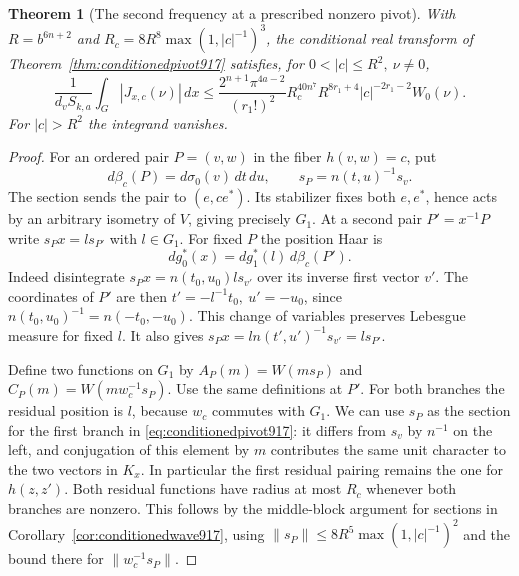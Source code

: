 \documentclass[a4paper,11pt]{article}
\newtheorem{theorem}[proposition]{Theorem}
\theoremstyle{definition}
\theoremstyle{remark}
\numberwithin{equation}{section}
\begin{document}
\begin{theorem}[The second frequency at a prescribed nonzero pivot]
\leavevmode\label{thm:secondallpositions918}
With \(R=b^{6n+2}\) and \(R_c=8R^8\max(1,|c|^{-1})^3\), the
conditional real transform of Theorem~\ref{thm:conditionedpivot917}
satisfies, for \(0<|c|\le R^2,\ \nu\ne0\),
\begin{equation}
 \frac{1}{d_vS_{k,a}}\int_G |J_{x,c}(\nu)|\,dx
 \le
 \frac{2^{n+1}\pi^{4a-2}}{(r_1!)^2}
    R_c^{40n^7} R^{8r_1+4}|c|^{-2r_1-2} W_0(\nu).
 \label{eq:secondallpositions918}
\end{equation}
For \(|c|>R^2\) the integrand vanishes.
\end{theorem}
\begin{proof}
For an ordered pair \(P=(v,w)\) in the fiber \(h(v,w)=c\),
put
\[
 d\beta_c(P)=d\sigma_0(v)\,dt\,du,\qquad
 s_P=n(t,u)^{-1}s_v .
\]
The section sends the pair to \((e,c e^*)\). Its stabilizer
fixes both \(e,e^*\), hence acts by an arbitrary isometry
of \(V\), giving precisely \(G_1\). At a second pair
\(P'=x^{-1}P\) write \(s_Px=l s_{P'}\) with \(l\in G_1\).
For fixed \(P\) the position Haar is
\[
                 dg_0^*(x)=dg_1^*(l)\,d\beta_c(P').
\]
Indeed disintegrate \(s_P x=n(t_0,u_0)l s_{v'}\) over
its inverse first vector \(v'\). The coordinates of \(P'\)
are then \(t'=-l^{-1}t_0,\ u'=-u_0\), since
\(n(t_0,u_0)^{-1}=n(-t_0,-u_0)\). This change of variables
preserves Lebesgue measure for fixed \(l\). It also gives
\(s_P x=l n(t',u')^{-1}s_{v'}=l s_{P'}\).

Define two functions on \(G_1\) by
\(A_P(m)=W(m s_P)\) and \(C_P(m)=W(m w_c^{-1}s_P)\).
Use the same definitions at \(P'\). For both branches the
residual position is \(l\), because \(w_c\) commutes with
\(G_1\). We can use \(s_P\) as the section for the first
branch in \eqref{eq:conditionedpivot917}: it differs from
\(s_v\) by \(n^{-1}\) on the left, and conjugation of this
element by \(m\) contributes the same unit character to the
two vectors in \(K_x\). In particular the first residual
pairing remains the one for \(h(z,z')\). Both residual
functions have radius at most \(R_c\) whenever both
branches are nonzero. This follows by the middle-block
argument for sections in Corollary~\ref{cor:conditionedwave917},
using \(\|s_P\|\le8R^5\max(1,|c|^{-1})^2\) and the bound
there for \(\|w_c^{-1}s_P\|\).


\end{proof}
\end{document}
